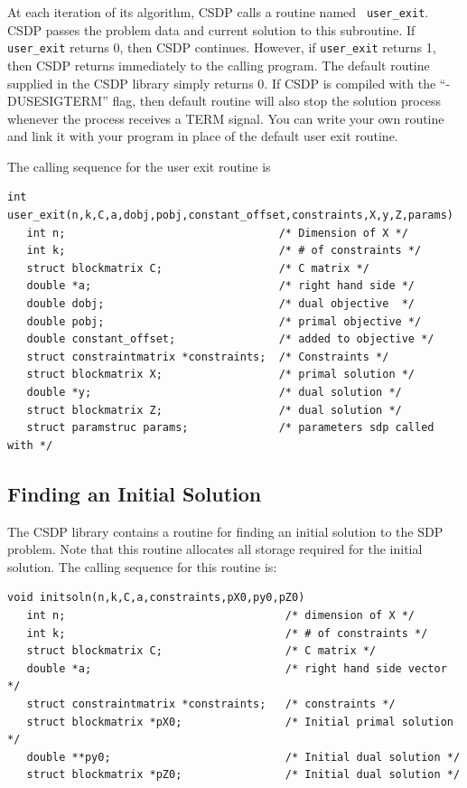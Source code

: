 \documentclass{article}
\begin{document}
At each iteration of its algorithm, CSDP calls a routine named {\tt
user\_exit}.  CSDP passes the problem data and current solution to
this subroutine.  If {\tt user\_exit} returns 0, then CSDP continues.
However, if {\tt user\_exit} returns 1, then CSDP returns immediately
to the calling program.  The default routine supplied in the CSDP
library simply returns 0.  If CSDP is compiled 
with the ``-DUSESIGTERM'' flag, then default routine will also stop
the solution process whenever the process receives a TERM signal.
You can write your own routine and link it
with your program in place of the default user exit routine.

The calling sequence for the user exit routine is
\begin{verbatim}
int user_exit(n,k,C,a,dobj,pobj,constant_offset,constraints,X,y,Z,params)
   int n;                                 /* Dimension of X */
   int k;                                 /* # of constraints */
   struct blockmatrix C;                  /* C matrix */
   double *a;                             /* right hand side */
   double dobj;                           /* dual objective  */
   double pobj;                           /* primal objective */
   double constant_offset;                /* added to objective */ 
   struct constraintmatrix *constraints;  /* Constraints */
   struct blockmatrix X;                  /* primal solution */
   double *y;                             /* dual solution */
   struct blockmatrix Z;                  /* dual solution */
   struct paramstruc params;              /* parameters sdp called with */
\end{verbatim}
\subsection*{Finding an Initial Solution}
The CSDP library contains a routine for finding an initial solution to the
SDP problem.  Note that this routine allocates all storage required for the
initial solution.  The calling sequence for this routine is:

\begin{verbatim}
void initsoln(n,k,C,a,constraints,pX0,py0,pZ0)
   int n;                                  /* dimension of X */
   int k;                                  /* # of constraints */
   struct blockmatrix C;                   /* C matrix */
   double *a;                              /* right hand side vector */
   struct constraintmatrix *constraints;   /* constraints */
   struct blockmatrix *pX0;                /* Initial primal solution */
   double **py0;                           /* Initial dual solution */
   struct blockmatrix *pZ0;                /* Initial dual solution */
\end{verbatim}
\end{document}
